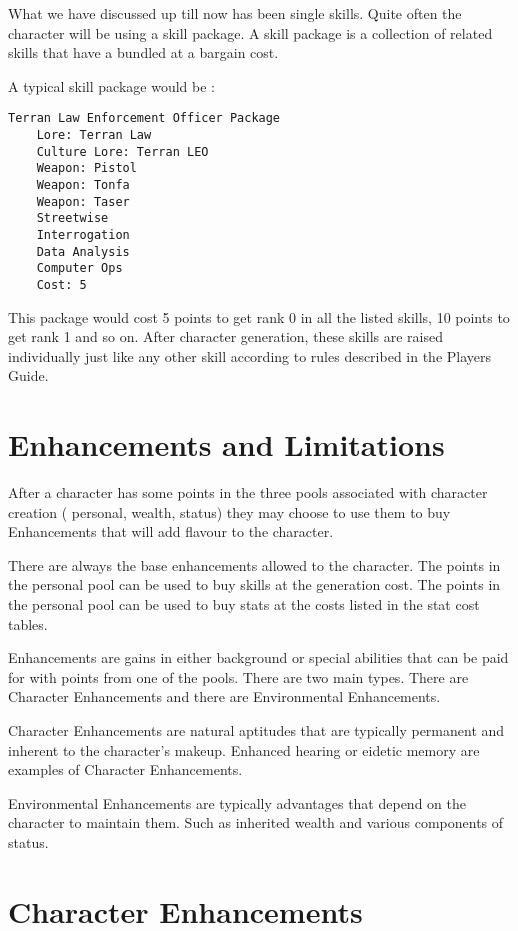 What we have discussed up till now has been single skills.
Quite often the character will be using a skill package.
A skill package is a collection of related skills that have a bundled 
at a bargain cost. 

A typical skill package would be :

\begin{verbatim}
Terran Law Enforcement Officer Package
	Lore: Terran Law
	Culture Lore: Terran LEO
    Weapon: Pistol 
    Weapon: Tonfa
    Weapon: Taser
    Streetwise
    Interrogation
    Data Analysis
    Computer Ops
    Cost: 5
\end{verbatim}

This package would cost 5 points to get rank 0 in all the listed skills, 10
points to get rank 1 and so on. After character generation, these skills
are raised individually just like any other skill according to rules
described in the Players Guide.

\section{Enhancements and Limitations}

After a character has some points in the three pools associated with
character creation ( personal, wealth, status) they may choose to
use them to buy Enhancements that will add flavour to the character.

There are always the base enhancements allowed to the character. The
points in the personal pool can be used to buy skills at the generation
cost. The points in the personal pool can be used to buy stats at the costs
listed in the stat cost tables.

Enhancements are gains in either background or special abilities that
can be paid for with points from one of the pools. There are two main
types. There are Character Enhancements and there are
Environmental Enhancements.

Character Enhancements are natural aptitudes that are typically 
permanent and inherent to the character's makeup. Enhanced hearing or
eidetic memory are examples of Character Enhancements.

Environmental Enhancements are typically advantages that depend on  the
character to maintain them. Such as inherited wealth and various components 
of status.

\section{Character Enhancements}

